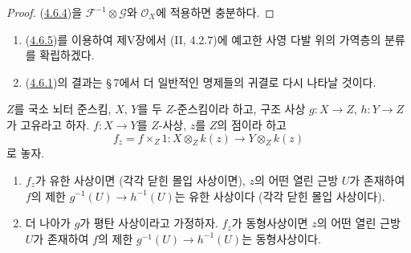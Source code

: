 \begin{proof}
(\hyperref[III.4.6.4-fr]{4.6.4})을
$\mathcal F^{-1}\otimes\mathcal G$와 $\mathcal O_X$에 적용하면
충분하다.
\end{proof}

\begin{remarks}[4.6.6]
\label{III.4.6.6-fr}
\begin{enumerate}
\item[(i)]
(\hyperref[III.4.6.5-fr]{4.6.5})를 이용하여 제V장에서
(II, 4.2.7)에 예고한 사영 다발 위의 가역층의 분류를 확립하겠다.
\item[(ii)]
(\hyperref[III.4.6.1-fr]{4.6.1})의 결과는 \S\,7에서 더 일반적인
명제들의 귀결로 다시 나타날 것이다.
\end{enumerate}
\end{remarks}

\begin{proposition}[4.6.7]
\label{III.4.6.7-fr}
$Z$를 국소 뇌터 준스킴, $X$, $Y$를 두 $Z$-준스킴이라 하고, 구조
사상 $g:X\to Z$, $h:Y\to Z$가 고유라고 하자. $f:X\to Y$를
$Z$-사상, $z$를 $Z$의 점이라 하고
\[
f_z=f\times_Z1:
X\otimes_Zk(z)\longrightarrow Y\otimes_Zk(z)
\]
로 놓자.
\begin{enumerate}
\item[(i)]
$f_z$가 유한 사상이면 (각각 닫힌 몰입 사상이면), $z$의 어떤 열린
근방 $U$가 존재하여 $f$의 제한
$g^{-1}(U)\to h^{-1}(U)$는 유한 사상이다 (각각 닫힌 몰입
사상이다).
\item[(ii)]
더 나아가 $g$가 평탄 사상이라고 가정하자. $f_z$가 동형사상이면
$z$의 어떤 열린 근방 $U$가 존재하여 $f$의 제한
$g^{-1}(U)\to h^{-1}(U)$는 동형사상이다.
\end{enumerate}
\end{proposition}

